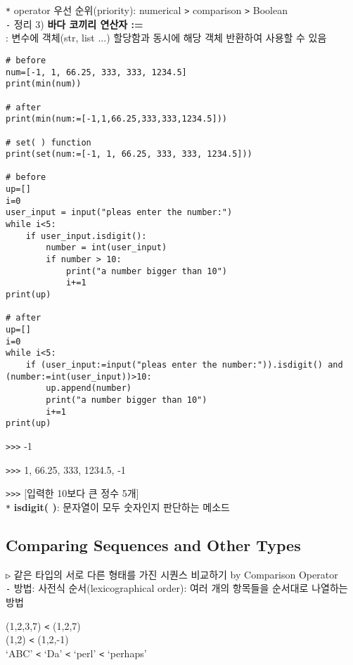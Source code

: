 \documentclass[11pt,a4paper]{article}
\begin{document}
\texttt{*} operator 우선 순위(priority): numerical \texttt{>} comparison \texttt{>} Boolean\\

\texttt{-} 정리 3) \textbf{바다 코끼리 연산자 :=}\\
: 변수에 객체(str, list ...) 할당함과 동시에 해당 객체 반환하여 사용할 수 있음\\
\begin{lstlisting}[label={list:first},caption=Walrus]
# before
num=[-1, 1, 66.25, 333, 333, 1234.5]
print(min(num))

# after
print(min(num:=[-1,1,66.25,333,333,1234.5]))

# set( ) function
print(set(num:=[-1, 1, 66.25, 333, 333, 1234.5]))

# before
up=[]
i=0
user_input = input("pleas enter the number:")
while i<5:
    if user_input.isdigit():
        number = int(user_input)
        if number > 10:
            print("a number bigger than 10")
            i+=1
print(up)

# after
up=[]
i=0
while i<5:
    if (user_input:=input("pleas enter the number:")).isdigit() and (number:=int(user_input))>10:
        up.append(number)
        print("a number bigger than 10")
        i+=1
print(up)
\end{lstlisting}
\verb|>>>| -1

\verb|>>>| {1, 66.25, 333, 1234.5, -1}

\verb|>>>| [입력한 10보다 큰 정수 5개]\\

\texttt{*} \textbf{isdigit( )}: 문자열이 모두 숫자인지 판단하는 메소드\\


\subsection{\Large\textbf{Comparing Sequences and Other Types}}
\begin{spacing}{1.5}
\texttt{▷} 같은 타입의 서로 다른 형태를 가진 시퀀스 비교하기 by Comparison Operator\\
\texttt{-} 방법: 사전식 순서(lexicographical order): 여러 개의 항목들을 순서대로 나열하는 방법

\hspace*{4em}(1,2,3,7) \texttt{<} (1,2,7)\\
\hspace*{4em}(1,2) \texttt{<} (1,2,-1)\\
\hspace*{4em}`ABC' \texttt{<} `Da' \texttt{<} `perl' \texttt{<} `perhaps'\\
\end{spacing}
\end{document}
